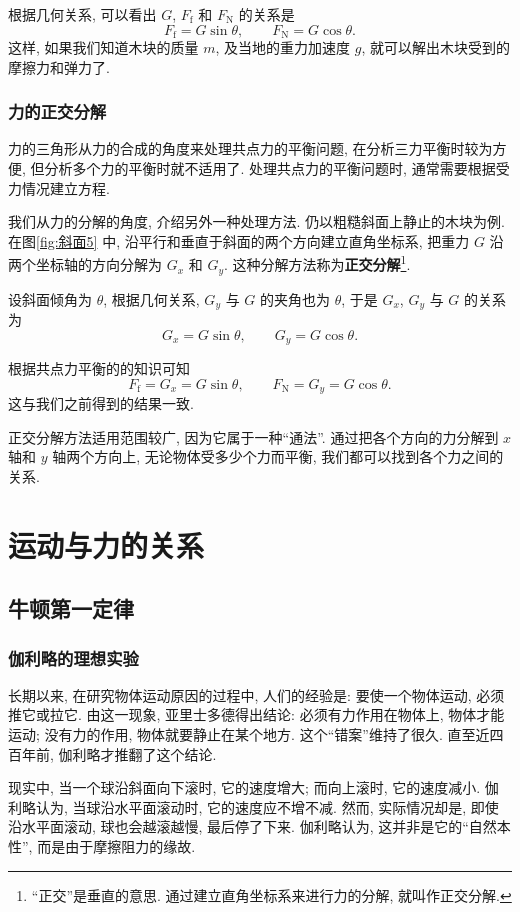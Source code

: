 \documentclass[UTF8,openany,fontset=fandol]{ctexbook}
\theoremstyle{chinesetextbook}
\begin{document}
根据几何关系, 可以看出 $G$, $F_\text{f}$ 和 $F_\text{N}$ 的关系是
\[
F_\text{f}=G\sin\theta,\qquad F_\text{N}=G\cos\theta.
\]
这样, 如果我们知道木块的质量 $m$, 及当地的重力加速度 $g$, 就可以解出木块受到的摩擦力和弹力了.
\subsection{力的正交分解}
力的三角形从力的合成的角度来处理共点力的平衡问题, 在分析三力平衡时较为方便, 但分析多个力的平衡时就不适用了. 处理共点力的平衡问题时, 通常需要根据受力情况建立方程.

我们从力的分解的角度, 介绍另外一种处理方法. 仍以粗糙斜面上静止的木块为例. 在图\ref{fig:斜面5} 中, 沿平行和垂直于斜面的两个方向建立直角坐标系, 把重力 $G$ 沿两个坐标轴的方向分解为 $G_x$ 和 $G_y$. 这种分解方法称为\textbf{正交分解}\footnote{“正交”是垂直的意思. 通过建立直角坐标系来进行力的分解, 就叫作正交分解.}.

设斜面倾角为 $\theta$, 根据几何关系, $G_y$ 与 $G$ 的夹角也为 $\theta$, 于是 $G_x$, $G_y$ 与 $G$ 的关系为
\[
G_x=G\sin\theta,\qquad G_y=G\cos\theta.
\]

根据共点力平衡的的知识可知
\[
F_\text{f}=G_x=G\sin\theta,\qquad F_\text{N}=G_y=G\cos\theta.
\]
这与我们之前得到的结果一致.

正交分解方法适用范围较广, 因为它属于一种“通法”. 通过把各个方向的力分解到 $x$ 轴和 $y$ 轴两个方向上, 无论物体受多少个力而平衡, 我们都可以找到各个力之间的关系.
\chapter{运动与力的关系}
\section{牛顿第一定律}
\subsection{伽利略的理想实验}\label{sec:伽利略的实验}
长期以来, 在研究物体运动原因的过程中, 人们的经验是: 要使一个物体运动, 必须推它或拉它. 由这一现象, 亚里士多德得出结论: 必须有力作用在物体上, 物体才能运动; 没有力的作用, 物体就要静止在某个地方. 这个“错案”维持了很久. 直至近四百年前, 伽利略才推翻了这个结论.

现实中, 当一个球沿斜面向下滚时, 它的速度增大; 而向上滚时, 它的速度减小. 伽利略认为, 当球沿水平面滚动时, 它的速度应不增不减. 然而, 实际情况却是, 即使沿水平面滚动, 球也会越滚越慢, 最后停了下来. 伽利略认为, 这并非是它的“自然本性”, 而是由于摩擦阻力的缘故.
\end{document}
